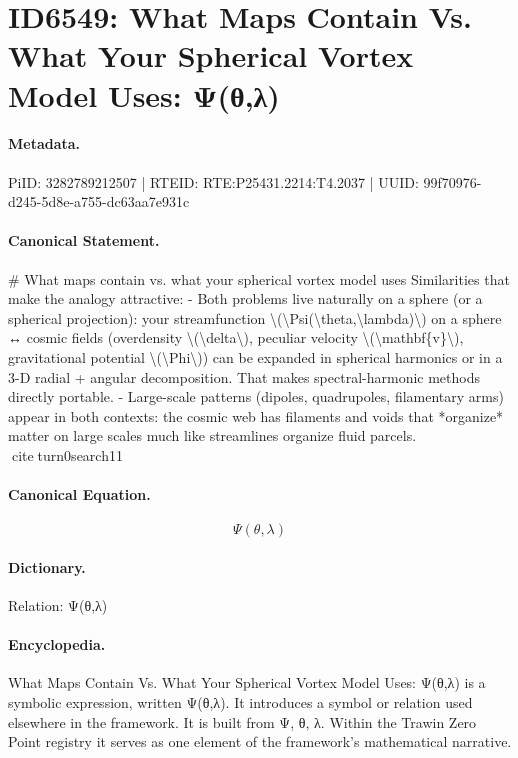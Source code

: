 \section*{ID6549: What Maps Contain Vs. What Your Spherical Vortex Model Uses: Ψ(θ,λ)}
\paragraph{Metadata.}
PiID: 3282789212507 | RTEID: RTE:P25431.2214:T4.2037 | UUID: 99f70976-d245-5d8e-a755-dc63aa7e931c

\paragraph{Canonical Statement.}
\# What maps contain vs. what your spherical vortex model uses Similarities that make the analogy attractive: - Both problems live naturally on a sphere (or a spherical projection): your streamfunction \textbackslash{}(\textbackslash{}Psi(\textbackslash{}theta,\textbackslash{}lambda)\textbackslash{}) on a sphere ↔ cosmic fields (overdensity \textbackslash{}(\textbackslash{}delta\textbackslash{}), peculiar velocity \textbackslash{}(\textbackslash{}mathbf\{v\}\textbackslash{}), gravitational potential \textbackslash{}(\textbackslash{}Phi\textbackslash{})) can be expanded in spherical harmonics or in a 3-D radial + angular decomposition. That makes spectral-harmonic methods directly portable. - Large-scale patterns (dipoles, quadrupoles, filamentary arms) appear in both contexts: the cosmic web has filaments and voids that *organize* matter on large scales much like streamlines organize fluid parcels. citeturn0search11

\paragraph{Canonical Equation.}
\[
\Psi(\theta,\lambda)
\]

\paragraph{Dictionary.}
Relation: Ψ(θ,λ)

\paragraph{Encyclopedia.}
What Maps Contain Vs. What Your Spherical Vortex Model Uses: Ψ(θ,λ) is a symbolic expression, written Ψ(θ,λ). It introduces a symbol or relation used elsewhere in the framework. It is built from Ψ, θ, λ. Within the Trawin Zero Point registry it serves as one element of the framework's mathematical narrative.
